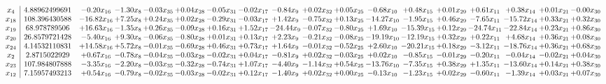 \documentclass[9pt]{article}
\begin{document}
 \[\begin{array}{c| c c@{\hskip 2pt} c@{\hskip 2pt} c@{\hskip 2pt} c@{\hskip 2pt} c@{\hskip 2pt} c@{\hskip 2pt} c@{\hskip 2pt} c@{\hskip 2pt} c@{\hskip 2pt} c@{\hskip 2pt} c@{\hskip 2pt} c@{\hskip 2pt} c@{\hskip 2pt} c@{\hskip 2pt} c@{\hskip 2pt} c@{\hskip 2pt} }
 x_{4}   &  4.88962499691 & -0.20 x_{16} & -1.30 x_{8} & -0.03 x_{35} & +  0.04 x_{28} & -0.05 x_{31} & -0.02 x_{17} & -0.84 x_{9} & +  0.02 x_{32} & +  0.05 x_{25} & -0.68 x_{10} & +  0.48 x_{15} & +  0.01 x_{29} & +  0.61 x_{11} & +  0.38 x_{14} & +  0.01 x_{21} & -0.00 x_{30}\\
 x_{18}   &  108.396430588 & -16.82 x_{16} & +  7.25 x_{8} & +  0.24 x_{35} & +  0.02 x_{28} & -0.29 x_{31} & -0.03 x_{17} & +  1.42 x_{9} & -0.75 x_{32} & +  0.13 x_{25} & -14.27 x_{10} & -1.95 x_{15} & +  0.46 x_{29} & -7.65 x_{11} & -15.72 x_{14} & +  0.33 x_{21} & +  0.32 x_{30}\\
 x_{19}   &  68.978789506 & + 16.63 x_{16} & -1.35 x_{8} & +  0.26 x_{35} & -0.09 x_{28} & +  0.16 x_{31} & +  1.52 x_{17} & -24.44 x_{9} & -0.07 x_{32} & -0.80 x_{25} & +  1.69 x_{10} & -15.39 x_{15} & +  0.12 x_{29} & -24.74 x_{11} & -22.84 x_{14} & +  0.23 x_{21} & +  0.86 x_{30}\\
 x_{20}   &  26.8579721428 & -5.40 x_{16} & +  9.30 x_{8} & -0.06 x_{35} & -0.80 x_{28} & +  0.01 x_{31} & +  0.13 x_{17} & +  2.23 x_{9} & -0.21 x_{32} & -0.08 x_{25} & -19.19 x_{10} & -12.19 x_{15} & +  0.32 x_{29} & +  0.22 x_{11} & +  4.68 x_{14} & +  0.36 x_{21} & +  0.08 x_{30}\\
 x_{24}   &  4.14532110831 & + 14.58 x_{16} & +  5.72 x_{8} & -0.01 x_{35} & -0.69 x_{28} & +  0.46 x_{31} & +  0.73 x_{17} & +  1.64 x_{9} & -0.01 x_{32} & -0.52 x_{25} & +  2.60 x_{10} & -20.21 x_{15} & +  0.18 x_{29} & -3.12 x_{11} & -18.76 x_{14} & +  0.36 x_{21} & +  0.68 x_{30}\\
 x_{2}   &  2.8715022929 & +  0.67 x_{16} & -0.78 x_{8} & -0.04 x_{35} & -0.03 x_{28} & -0.02 x_{31} & +  0.04 x_{17} & -0.81 x_{9} & +  0.02 x_{32} & -0.03 x_{25} & +  0.02 x_{10} & -0.85 x_{15} & -0.01 x_{29} & -0.20 x_{11} & -0.04 x_{14} & -0.02 x_{21} & +  0.04 x_{30}\\
 x_{23}   &  107.984807888 & -3.35 x_{16} & -2.20 x_{8} & -0.03 x_{35} & -0.32 x_{28} & -0.74 x_{31} & +  1.07 x_{17} & -4.40 x_{9} & -1.14 x_{32} & +  0.54 x_{25} & -13.76 x_{10} & -7.35 x_{15} & +  0.38 x_{29} & +  1.35 x_{11} & -13.60 x_{14} & +  0.14 x_{21} & +  0.38 x_{30}\\
 x_{12}   &  7.15957493213 & +  0.54 x_{16} & -0.79 x_{8} & -0.02 x_{35} & -0.03 x_{28} & -0.02 x_{31} & +  0.12 x_{17} & -1.40 x_{9} & +  0.02 x_{32} & +  0.00 x_{25} & -0.13 x_{10} & -1.23 x_{15} & +  0.02 x_{29} & -0.60 x_{11} & -1.39 x_{14} & +  0.03 x_{21} & +  0.07 x_{30}\\

\end{array}\]
\end{document}
